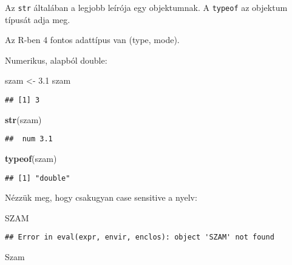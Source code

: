 \documentclass[
]{book}
\newenvironment{Shaded}{\begin{snugshade}}{\end{snugshade}}
\newcommand{\FloatTok}[1]{\textcolor[rgb]{0.00,0.00,0.81}{#1}}
\newcommand{\KeywordTok}[1]{\textcolor[rgb]{0.13,0.29,0.53}{\textbf{#1}}}
\newcommand{\NormalTok}[1]{#1}
\newcommand{\StringTok}[1]{\textcolor[rgb]{0.31,0.60,0.02}{#1}}
\begin{document}
Az \texttt{str} általában a legjobb leírója egy objektumnak. A \texttt{typeof} az objektum típusát adja meg.

Az R-ben 4 fontos adattípus van (type, mode).

Numerikus, alapból double:

\begin{Shaded}
\begin{Highlighting}[]
\NormalTok{szam <-}\StringTok{ }\FloatTok{3.1}
\NormalTok{szam}
\end{Highlighting}
\end{Shaded}

\begin{verbatim}
## [1] 3
\end{verbatim}

\begin{Shaded}
\begin{Highlighting}[]
\KeywordTok{str}\NormalTok{(szam)}
\end{Highlighting}
\end{Shaded}

\begin{verbatim}
##  num 3.1
\end{verbatim}

\begin{Shaded}
\begin{Highlighting}[]
\KeywordTok{typeof}\NormalTok{(szam)}
\end{Highlighting}
\end{Shaded}

\begin{verbatim}
## [1] "double"
\end{verbatim}

Nézzük meg, hogy csakugyan case sensitive a nyelv:

\begin{Shaded}
\begin{Highlighting}[]
\NormalTok{SZAM}
\end{Highlighting}
\end{Shaded}

\begin{verbatim}
## Error in eval(expr, envir, enclos): object 'SZAM' not found
\end{verbatim}

\begin{Shaded}
\begin{Highlighting}[]
\NormalTok{Szam}
\end{Highlighting}
\end{Shaded}
\end{document}
